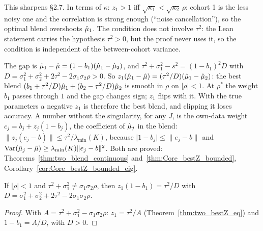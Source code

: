 \begin{remark}\label{rem:gt_one}
  This sharpens §2.7. In terms of $\kappa$: $z_1 > 1$ iff
  $\sqrt{\kappa_1} < \sqrt{\kappa_2}\,\rho$: cohort 1 is the less noisy one
  and the correlation is strong enough (``noise cancellation''), so the
  optimal blend overshoots $\hat\mu_1$. The condition
  does not involve $\tau^2$: the Lean statement carries the hypothesis
  $\tau^2 > 0$, but the proof never uses it, so the condition is
  independent of the between-cohort variance.
\end{remark}

\begin{remark}\label{rem:sing_continuous}
  The gap is $\hat\mu_1 - \hat\mu = (1 - b_1)(\hat\mu_1 - \hat\mu_2)$, and
  $\tau^2 + \sigma_1^2 - s^2 = (1 - b_1)^2 D$ with
  $D = \sigma_1^2 + \sigma_2^2 + 2\tau^2 - 2\sigma_1\sigma_2\rho > 0$. So
  $z_1(\hat\mu_1 - \hat\mu) = (\tau^2/D)(\hat\mu_1 - \hat\mu_2)$: the best blend
  $(b_1 + \tau^2/D)\hat\mu_1 + (b_2 - \tau^2/D)\hat\mu_2$ is smooth in $\rho$ on
  $|\rho| < 1$. At $\rho^*$ the weight $b_1$ passes through $1$ and the gap
  changes sign; $z_1$ flips with it. With the true parameters a negative
  $z_1$ is therefore the best blend, and clipping it  loses
  accuracy. A number without the singularity, for any $J$, is the own-data
  weight $c_j = b_j + z_j(1 - b_j)$, the coefficient of $\hat\mu_j$ in the
  blend: $\lVert z_j(e_j - b)\rVert \le \tau^2/\lambda_{\min}(K)$, because
  $\lvert 1 - b_j\rvert \le \lVert e_j - b\rVert$ and
  $\operatorname{Var}(\hat\mu_j - \hat\mu) \ge \lambda_{\min}(K)\lVert e_j - b\rVert^2$.
  Both are proved: Theorems~\ref{thm:two_blend_continuous}
  and~\ref{thm:Core_bestZ_bounded}, Corollary~\ref{cor:Core_bestZ_bounded_eig}.
\end{remark}

\begin{theorem}\label{thm:two_blend_continuous}
  \leanok
  If $|\rho| < 1$ and $\tau^2 + \sigma_1^2 \ne \sigma_1\sigma_2\rho$, then
  $z_1(1 - b_1) = \tau^2/D$ with
  $D = \sigma_1^2 + \sigma_2^2 + 2\tau^2 - 2\sigma_1\sigma_2\rho$.
\end{theorem}
\begin{proof}
  \leanok
  With $A = \tau^2 + \sigma_1^2 - \sigma_1\sigma_2\rho$: $z_1 = \tau^2/A$
  (Theorem~\ref{thm:two_bestZ_eq}) and $1 - b_1 = A/D$, with $D > 0$.
\end{proof}

